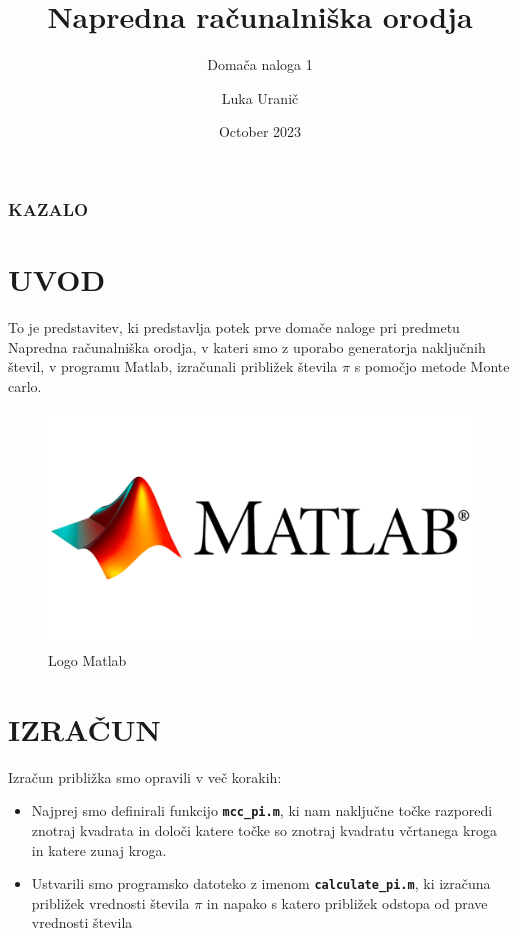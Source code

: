 \documentclass{beamer}
\title{Napredna računalniška orodja}
\subtitle{Domača naloga 1}
\author{Luka Uranič}
\institute{UL, Fakulteta za strojništvo}
\date{October 2023}
\begin{document}
\maketitle

\begin{frame}
\frametitle{KAZALO}
\tableofcontents
\end{frame}

\section{UVOD}
\begin{frame}
To je predstavitev, ki predstavlja potek prve domače naloge pri predmetu Napredna računalniška orodja, v kateri smo z uporabo generatorja naključnih števil, v programu Matlab, izračunali približek števila $\pi$ s pomočjo metode Monte carlo.
\begin{figure}[h!]
    \centering
    \includegraphics[scale=0.12]{Matlab_LOGO.png}
    \caption{Logo Matlab}
    \label{fig:enter-label}
\end{figure}
\end{frame}

\section{IZRAČUN}
\begin{frame}
Izračun približka smo opravili v več korakih:
\begin{itemize}
  \pause
  \item<1-> Najprej smo definirali funkcijo \textbf{\texttt{mcc\_pi.m}}, ki nam naključne točke razporedi znotraj kvadrata in določi katere točke so znotraj kvadratu včrtanega kroga in katere zunaj kroga.
  \pause
  \item<2-> Ustvarili smo programsko datoteko z imenom \textbf{\texttt{calculate\_pi.m}}, ki izračuna približek vrednosti števila $\pi$ in napako s katero približek odstopa od prave vrednosti števila
\end{itemize}
\end{frame}
\end{document}
